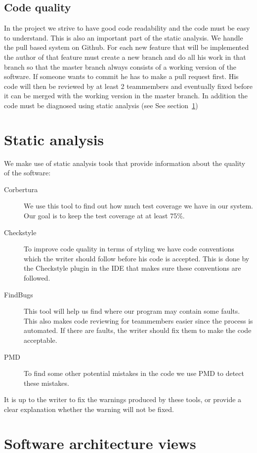 \documentclass[a4paper]{article}
\begin{document}
\subsection{Code quality}
In the project we strive to have good code readability and the code must be easy to understand. This is also an important part of the static analysis. We handle the pull based system on Github. For each new feature that will be implemented the author of that feature must create a new branch and do all his work in that branch so that the master branch always consists of a working version of the software. If someone wants to commit he has to make a pull request first. His code will then be reviewed by at least 2 teammembers and eventually fixed before it can be merged with the working version in the master branch. In addition the code must be diagnosed using static analysis (see See section~\ref{sec:static})

\section{Static analysis}
\label{sec:static}
We make use of static analysis tools that provide information about the quality of the software:
\begin{description}
\item[Corbertura] We use this tool to find out how much test coverage we have in our system. Our goal is to keep the test coverage at at least 75\%.
\item[Checkstyle] To improve code quality in terms of styling we have code conventions which the writer should follow before his code is accepted. This is done by the Checkstyle plugin in the IDE that makes sure these conventions are followed.
\item[FindBugs] This tool will help us find where our program may contain some faults. This also makes code reviewing for teammembers easier since the process is automated. If there are faults, the writer should fix them to make the code acceptable.
\item[PMD] To find some other potential mistakes in the code we use PMD to detect these mistakes.
\end{description}

It is up to the writer to fix the warnings produced by these tools, or provide a clear explanation whether the warning will not be fixed.


\section{Software architecture views}
\end{document}

